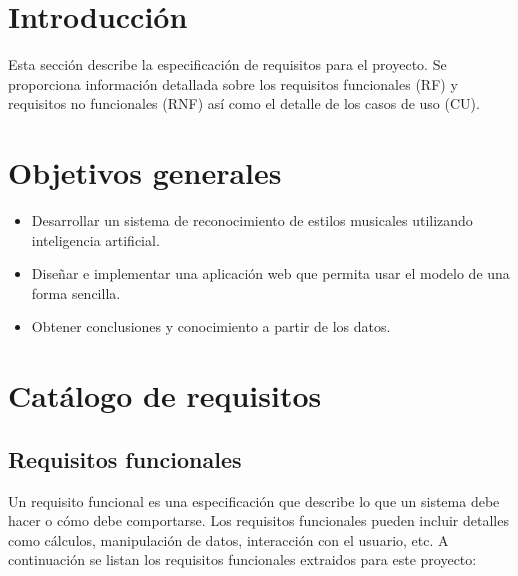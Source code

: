 
\section{Introducción}

Esta sección describe la especificación de requisitos para el proyecto. Se proporciona información detallada sobre los requisitos funcionales (RF) y requisitos no funcionales (RNF) así como el detalle de los casos de uso (CU).

\section{Objetivos generales}

\begin{itemize}
\tightlist
\item Desarrollar un sistema de reconocimiento de estilos musicales utilizando inteligencia artificial.
\item Diseñar e implementar una aplicación web que permita usar el modelo de una forma sencilla.
\item Obtener conclusiones y conocimiento a partir de los datos.
\end{itemize}

\section{Catálogo de requisitos}

\subsection{Requisitos funcionales}

Un requisito funcional es una especificación que describe lo que un sistema debe hacer o cómo debe comportarse.
Los requisitos funcionales pueden incluir detalles como cálculos, manipulación de datos, interacción con el usuario, etc. \cite{Blog_2018}
A continuación se listan los requisitos funcionales extraidos para este proyecto:

